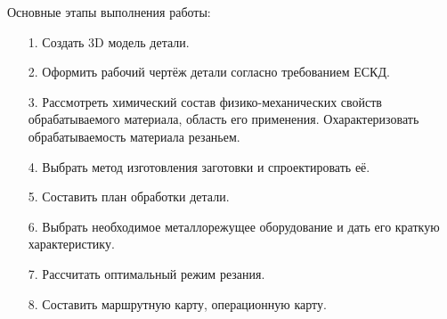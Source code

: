
Основные этапы выполнения работы:
\begin{enumerate}
    \item[1.] Создать 3D модель детали.  
    \item[2.] Оформить рабочий чертёж детали согласно требованием ЕСКД.
    \item[3.] Рассмотреть химический состав физико-механических свойств обрабатываемого материала, область его применения. Охарактеризовать обрабатываемость материала резаньем. 
    \item[4.] Выбрать метод изготовления заготовки и спроектировать её. 
    \item[5.] Составить план обработки детали.  
    \item[6.] Выбрать необходимое металлорежущее оборудование и дать его краткую характеристику. 
    \item[7.] Рассчитать оптимальный режим резания.
    \item[8.] Составить маршрутную карту, операционную карту.    
\end{enumerate}

